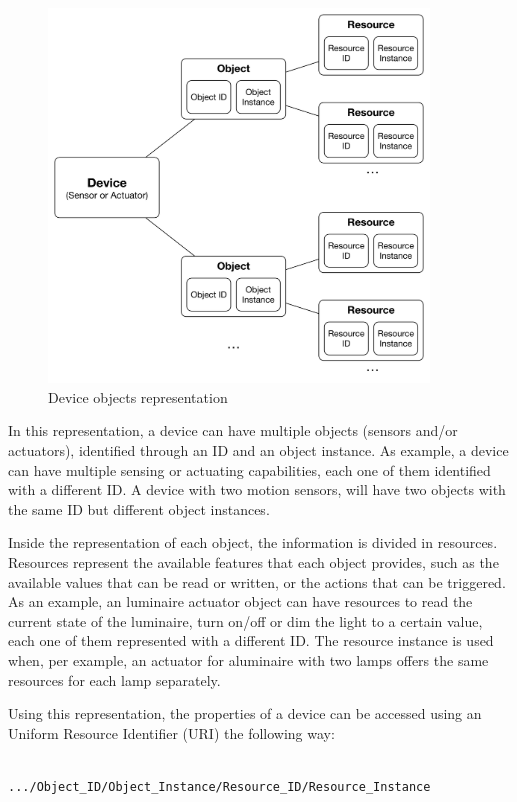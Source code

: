 \begin{figure}[H]
	\centering
	\includegraphics[width=0.9\textwidth]{figures/obj.png}
	\caption{Device objects representation}
	\label{fig:obj}
\end{figure}

In this representation, a device can have multiple objects (sensors and/or actuators), identified through an ID and an object instance. As example, a device can have multiple sensing or actuating capabilities, each one of them identified with a different ID. A device with two motion sensors, will have two objects with the same ID but different object instances. 

Inside the representation of each object, the information is divided in resources. Resources represent the available features that each object provides, such as the available values that can be read or written, or the actions that can be triggered. As an example, an luminaire actuator object can have resources to read the current state of the luminaire, turn  on/off or dim the light to a certain value, each one of them represented with a different ID. The resource instance is used when, per example, an actuator for aluminaire with two lamps offers the same resources for each lamp separately.

Using this representation, the properties of a device can be accessed using an Uniform Resource Identifier (URI) the following way: 


\begin{verbatim}

.../Object_ID/Object_Instance/Resource_ID/Resource_Instance
	

\end{verbatim}
	
